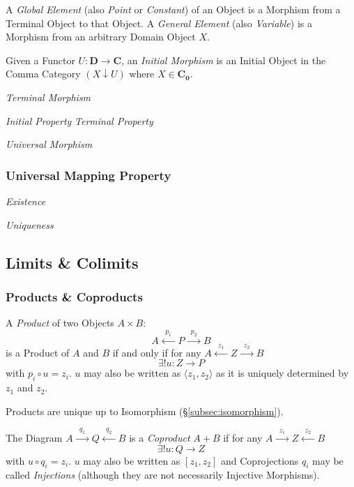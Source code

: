 A \emph{Global Element} (also \emph{Point} or \emph{Constant}) of an
Object is a Morphism from a Terminal Object to that Object. A
\emph{General Element} (also \emph{Variable}) is a Morphism from an
arbitrary Domain Object $X$.

Given a Functor $U: \mathbf{D} \rightarrow \mathbf{C}$, an
\emph{Initial Morphism} is an Initial Object in the Comma Category $(X
\downarrow U)$ where $X \in \mathbf{C_0}$.

\emph{Terminal Morphism}

\emph{Initial Property} \emph{Terminal Property}

\emph{Universal Morphism}

\subsubsection{Universal Mapping Property}
\label{subsec:universal_mapping_property}

\emph{Existence}

\emph{Uniqueness}

\subsection{Limits \& Colimits}\label{subsec:category_limits}


\subsubsection{Products \& Coproducts}\label{subsec:product_diagram}

A \emph{Product} of two Objects $A \times B$:
\[
    A \xleftarrow{\;\;p_1\;\;} P \xrightarrow{\;\;p_2\;\;} B
\]
is a Product of $A$ and $B$ if and only if for any $A
\xleftarrow{\;\;z_1\;\;} Z \xrightarrow{\;\;z_2\;\;} B$
\[
    \exists!u : Z \rightarrow P
\]
with $p_i \circ u = z_i$. $u$ may also be written as $\langle z_1, z_2
\rangle$ as it is uniquely determined by $z_1$ and $z_2$.

Products are unique up to Isomorphism (\S\ref{subsec:isomorphism}).

The Diagram $A \xrightarrow{\;\;q_1\;\;} Q \xleftarrow{\;\;q_2\;\;} B$
is a \emph{Coproduct} $A + B$ if for any $A \xrightarrow{\;\;z_1\;\;} Z
\xleftarrow{\;\;z_2\;\;} B$
\[
    \exists!u : Q \rightarrow Z
\]
with $u \circ q_i = z_i$. $u$ may also be written as $[ z_1, z_2 ]$
and Coprojections $q_i$ may be called \emph{Injections} (although they
are not necessarily Injective Morphisms).

